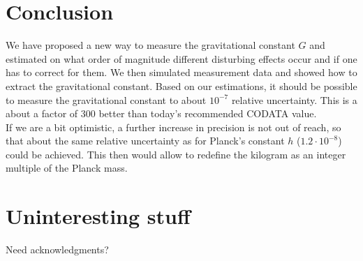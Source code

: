 \documentclass[prb,preprint]{revtex4-1}
\begin{document}
\section{Conclusion}
We have proposed a new way to measure the gravitational constant $G$ and estimated on what order of magnitude different disturbing effects occur and if one has to correct for them. We then simulated measurement data and showed how to extract the gravitational constant. Based on our estimations, it should be possible to measure the gravitational constant to about $10^{-7}$ relative uncertainty. This is a about a factor of 300 better than today's recommended CODATA value.\\
If we are a bit optimistic, a further increase in precision is not out of reach, so that about the same relative uncertainty as for Planck's constant $h$ ($1.2 \cdot 10^{-8}$)\cite{CODATA16} could be achieved. This then would allow to redefine the kilogram as an integer multiple of the Planck mass.\\





\appendix*   %

\section{Uninteresting stuff}



\begin{acknowledgments}
Need acknowledgments?
\end{acknowledgments}
\end{document}
